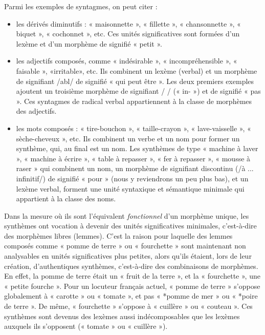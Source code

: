 Parmi les exemples de syntagmes, on peut citer :
\begin{itemize}
\item les dérivés diminutifs : « maisonnette », « fillette », « chansonnette », « biquet », « cochonnet », etc. Ces unités significatives sont formées d’un lexème et d’un morphème de signifié « petit ».
\item les adjectifs composés, comme « indésirable », « incompréhensible », « faisable », «irritable», etc. Ils combinent un lexème (verbal) et un morphème de signifiant /abl/ de signifié « qui peut être ». Les deux premiers exemples ajoutent un troisième morphème de signifiant /  / (« in- ») et de signifié « pas ». Ces syntagmes de radical verbal appartiennent à la classe de morphèmes des adjectifs.
\item les mots composés : « tire-bouchon », « taille-crayon », « lave-vaisselle », « sèche-cheveux », etc. Ils combinent un verbe et un nom pour former un synthème, qui, au final est un nom. Les synthèmes de type « machine à laver », « machine à écrire », « table à repasser », « fer à repasser », « mousse à raser » qui combinent un nom, un morphème de signifiant discontinu (/à ... infinitif/) de signifié « pour » (nous y reviendrons un peu plus bas), et un lexème verbal, forment une unité syntaxique et sémantique minimale qui appartient à la classe des noms.
\end{itemize}
Dans la mesure où ils sont l’équivalent \textit{fonctionnel} d’un morphème unique, les synthèmes ont vocation à devenir des unités significatives minimales, c’est-à-dire des morphèmes libres (lemmes). C’est la raison pour laquelle des lemmes composés comme « pomme de terre » ou « fourchette » sont maintenant non analysables en unités significatives plus petites, alors qu’ils étaient, lors de leur création, d’authentiques synthèmes, c’est-à-dire des combinaisons de morphèmes. En effet, la pomme de terre était un « fruit de la terre », et la « fourchette », une « petite fourche ». Pour un locuteur français actuel, « pomme de terre » s’oppose globalement à « carotte » ou « tomate », et pas « *pomme de mer » ou « *poire de terre ». De même, « fourchette » s’oppose à « cuillère » ou « couteau ». Ces synthèmes sont devenus des lexèmes aussi indécomposables que les lexèmes auxquels ils s’opposent (« tomate » ou « cuillère »).

